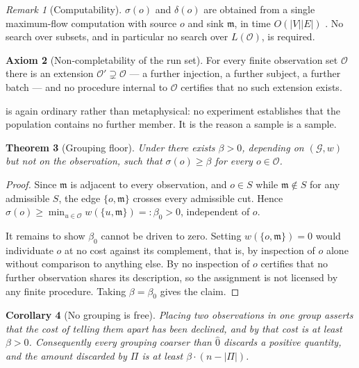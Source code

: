 \documentclass[11pt,a4paper]{article}
\newtheorem{theorem}{Theorem}[section]
\newtheorem{corollary}[theorem]{Corollary}
\theoremstyle{definition}
\newtheorem{axiom}[theorem]{Axiom}
\theoremstyle{remark}
\newtheorem{remark}[theorem]{Remark}
\newcommand{\Gph}{\mathcal{G}}
\newcommand{\wt}{w}
\newcommand{\med}{\mathfrak{m}}
\newcommand{\flo}{\beta}
\newcommand{\sep}{\sigma}
\newcommand{\dep}{\delta}
\newcommand{\Obs}{\mathcal{O}}               %
\newcommand{\Part}{\Pi}                      %
\begin{document}
\begin{remark}[Computability]\label{rem:computable}
$\sep(o)$ and $\dep(o)$ are obtained from a single maximum-flow
computation with source $o$ and sink $\med$, in time $O(|V||E|)$
\citep{fordfulkerson1956,goldberg1988new}. No search over subsets, and in
particular no search over $L(\Obs)$, is required.
\end{remark}

\begin{axiom}[Non-completability of the run set]\label{ax:noncomplete}
For every finite observation set $\Obs$ there is an extension
$\Obs' \supsetneq \Obs$ --- a further injection, a further subject, a
further batch --- and no procedure internal to $\Obs$ certifies that no
such extension exists.
\end{axiom}

 is again ordinary rather than metaphysical: no
experiment establishes that the population contains no further member. It
is the reason a sample is a sample.

\begin{theorem}[Grouping floor]\label{thm:group-floor}
Under  there exists $\flo > 0$, depending on
$(\Gph,\wt)$ but not on the observation, such that $\sep(o) \geq \flo$
for every $o \in \Obs$.
\end{theorem}

\begin{proof}
Since $\med$ is adjacent to every observation, and $o \in S$ while
$\med \notin S$ for any admissible $S$, the edge $\{o,\med\}$ crosses
every admissible cut. Hence
$\sep(o) \geq \min_{u \in \Obs} \wt(\{u,\med\}) =: \flo_0 > 0$,
independent of $o$.

It remains to show $\flo_0$ cannot be driven to zero. Setting
$\wt(\{o,\med\}) = 0$ would individuate $o$ at no cost against its
complement, that is, by inspection of $o$ alone without comparison to
anything else. By  no inspection of $o$ certifies
that no further observation shares its description, so the assignment is
not licensed by any finite procedure. Taking $\flo = \flo_0$ gives the
claim.
\end{proof}

\begin{corollary}[No grouping is free]\label{cor:no-free}
Placing two observations in one group asserts that the cost of telling
them apart has been declined, and by  that cost is
at least $\flo > 0$. Consequently every grouping coarser than $\hat{0}$
discards a positive quantity, and the amount discarded by $\Part$ is at
least $\flo \cdot (n - |\Part|)$.
\end{corollary}
\end{document}
